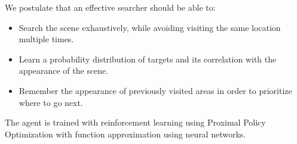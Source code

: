 



We postulate that an effective searcher should be able to:

\begin{itemize}
    \item Search the scene exhaustively, while avoiding visiting the same location multiple times.
    \item Learn a probability distribution of targets and its correlation with the appearance of the scene.
    \item Remember the appearance of previously visited areas in order to prioritize where to go next.
\end{itemize}

The agent is trained with reinforcement learning using Proximal Policy Optimization with function approximation using neural networks. 






